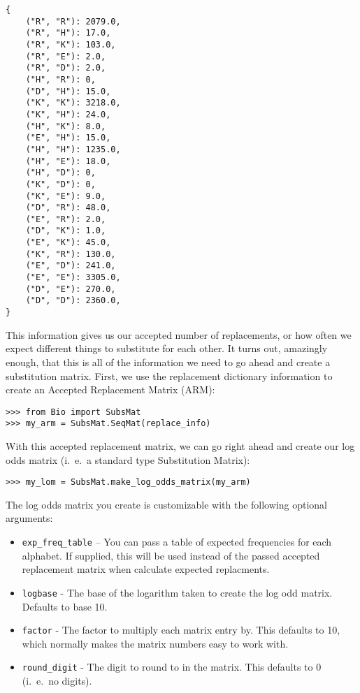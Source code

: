\begin{verbatim}
{
    ("R", "R"): 2079.0,
    ("R", "H"): 17.0,
    ("R", "K"): 103.0,
    ("R", "E"): 2.0,
    ("R", "D"): 2.0,
    ("H", "R"): 0,
    ("D", "H"): 15.0,
    ("K", "K"): 3218.0,
    ("K", "H"): 24.0,
    ("H", "K"): 8.0,
    ("E", "H"): 15.0,
    ("H", "H"): 1235.0,
    ("H", "E"): 18.0,
    ("H", "D"): 0,
    ("K", "D"): 0,
    ("K", "E"): 9.0,
    ("D", "R"): 48.0,
    ("E", "R"): 2.0,
    ("D", "K"): 1.0,
    ("E", "K"): 45.0,
    ("K", "R"): 130.0,
    ("E", "D"): 241.0,
    ("E", "E"): 3305.0,
    ("D", "E"): 270.0,
    ("D", "D"): 2360.0,
}
\end{verbatim}

This information gives us our accepted number of replacements, or how
often we expect different things to substitute for each other. It
turns out, amazingly enough, that this is all of the information we
need to go ahead and create a substitution matrix. First, we use the
replacement dictionary information to create an Accepted Replacement
Matrix (ARM):

\begin{verbatim}
>>> from Bio import SubsMat
>>> my_arm = SubsMat.SeqMat(replace_info)
\end{verbatim}

With this accepted replacement matrix, we can go right ahead and
create our log odds matrix (i.~e.~a standard type Substitution Matrix):

\begin{verbatim}
>>> my_lom = SubsMat.make_log_odds_matrix(my_arm)
\end{verbatim}

The log odds matrix you create is customizable with the following
optional arguments:

\begin{itemize}
  \item \verb|exp_freq_table| -- You can pass a table of expected
  frequencies for each alphabet. If supplied, this will be used
  instead of the passed accepted replacement matrix when calculate
  expected replacments.

  \item \verb|logbase| - The base of the logarithm taken to create the
  log odd matrix. Defaults to base 10.

  \item \verb|factor| - The factor to multiply each matrix entry
  by. This defaults to 10, which normally makes the matrix numbers
  easy to work with.

  \item \verb|round_digit| - The digit to round to in the matrix. This
  defaults to 0 (i.~e.~no digits).

\end{itemize}

